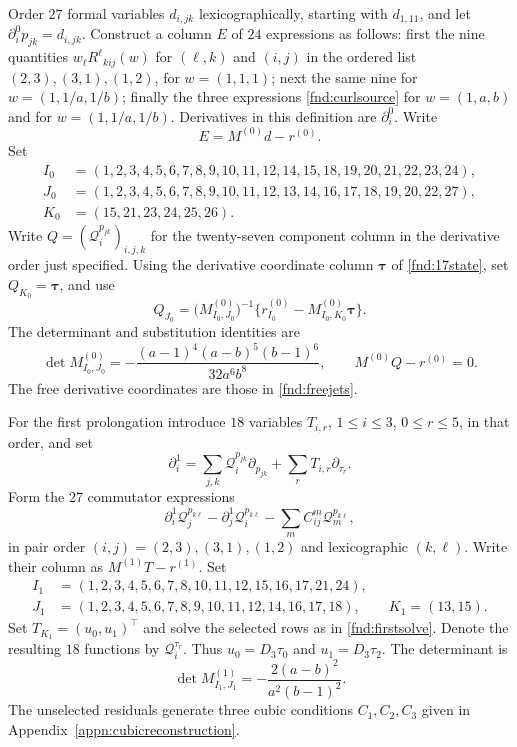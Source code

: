 \documentclass[11pt,a4paper]{article}
\numberwithin{equation}{section}
\theoremstyle{plain}
\theoremstyle{definition}
\theoremstyle{remark}
\begin{document}
Order $27$ formal variables $d_{i,jk}$ lexicographically, starting with $d_{1,11}$, and let $\partial_i^0p_{jk}=d_{i,jk}$. Construct a column $E$ of $24$ expressions as follows: first the nine quantities $w_\ell R^\ell{}_{kij}(w)$ for $(\ell,k)$ and $(i,j)$ in the ordered list $(2,3),(3,1),(1,2)$, for $w=(1,1,1)$; next the same nine for $w=(1,1/a,1/b)$; finally the three expressions \eqref{fnd:curlsource} for $w=(1,a,b)$ and for $w=(1,1/a,1/b)$. Derivatives in this definition are $\partial_i^0$. Write
\[
E=M^{(0)}d-r^{(0)}.
\]
Set
\begin{align*}
I_0&=(1,2,3,4,5,6,7,8,9,10,11,12,14,15,18,19,20,21,22,23,24),\\
J_0&=(1,2,3,4,5,6,7,8,9,10,11,12,13,14,16,17,18,19,20,22,27),\\
K_0&=(15,21,23,24,25,26).
\end{align*}
Write $Q=(\mathcal Q_i^{p_{jk}})_{i,j,k}$ for the twenty-seven component
column in the derivative order just specified.
Using the derivative coordinate column $\boldsymbol\tau$ of \eqref{fnd:17state}, set
$Q_{K_0}=\boldsymbol\tau$, and use
\begin{equation}\label{fnd:firstsolve}
Q_{J_0}=\bigl(M^{(0)}_{I_0,J_0}\bigr)^{-1}
\{r^{(0)}_{I_0}-M^{(0)}_{I_0,K_0}\boldsymbol\tau\}.
\end{equation}
The determinant and substitution identities are
\begin{equation}\label{fnd:firstminor}
\det M^{(0)}_{I_0,J_0}=-\frac{(a-1)^4(a-b)^5(b-1)^6}{32a^6b^8},
\qquad M^{(0)}Q-r^{(0)}=0.
\end{equation}
The free derivative coordinates are those in \eqref{fnd:freejets}.

For the first prolongation introduce $18$ variables $T_{i,r}$, $1\le i\le3$, $0\le r\le5$, in that order, and set
\[
\partial_i^1=\sum_{j,k}\mathcal Q_i^{p_{jk}}\partial_{p_{jk}}+\sum_rT_{i,r}\partial_{\tau_r}.
\]
Form the $27$ commutator expressions
\begin{equation}\label{fnd:firstprolong}
\partial_i^1\mathcal Q_j^{p_{k\ell}}-\partial_j^1\mathcal Q_i^{p_{k\ell}}
-\sum_mC^m_{ij}\mathcal Q_m^{p_{k\ell}},
\end{equation}
in pair order $(i,j)=(2,3),(3,1),(1,2)$ and lexicographic $(k,\ell)$. Write their column as $M^{(1)}T-r^{(1)}$. Set
\begin{align*}
I_1&=(1,2,3,4,5,6,7,8,10,11,12,15,16,17,21,24),\\
J_1&=(1,2,3,4,5,6,7,8,9,10,11,12,14,16,17,18),\qquad K_1=(13,15).
\end{align*}
Set $T_{K_1}=(u_0,u_1)^{\top}$ and solve the selected rows as in \eqref{fnd:firstsolve}. Denote the resulting $18$ functions by $\mathcal Q_i^{\tau_r}$. Thus $u_0=D_3\tau_0$ and $u_1=D_3\tau_2$. The determinant is
\begin{equation}\label{fnd:secondminor}
\det M^{(1)}_{I_1,J_1}=-\frac{2(a-b)^2}{a^2(b-1)^2}.
\end{equation}
The unselected residuals generate three cubic conditions $C_1,C_2,C_3$ given in Appendix~\ref{appn:cubicreconstruction}.
\end{document}
